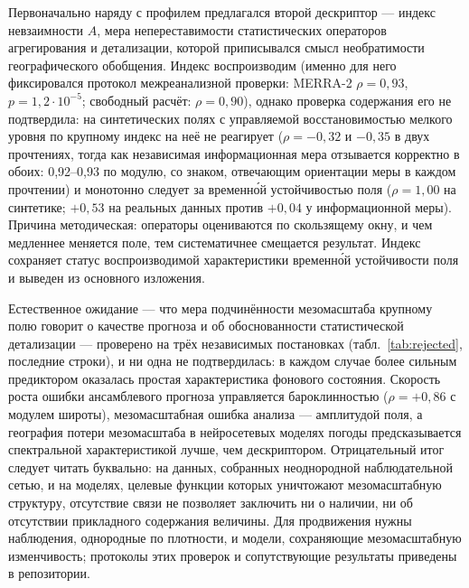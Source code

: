 \documentclass[11pt,a4paper]{article}
\begin{document}
Первоначально наряду с профилем предлагался второй дескриптор --- индекс невзаимности $A$, мера непереставимости статистических операторов агрегирования и детализации, которой приписывался смысл необратимости географического обобщения. Индекс воспроизводим (именно для него фиксировался протокол межреанализной проверки: MERRA-2 $\rho=0{,}93$, $p=1{,}2\cdot10^{-5}$; свободный расчёт: $\rho=0{,}90$), однако проверка содержания его не подтвердила: на синтетических полях с управляемой восстановимостью мелкого уровня по крупному индекс на неё не реагирует ($\rho=-0{,}32$ и $-0{,}35$ в двух прочтениях, тогда как независимая информационная мера отзывается корректно в обоих: 0,92--0,93 по модулю, со знаком, отвечающим ориентации меры в каждом прочтении) и монотонно следует за временн\'{о}й устойчивостью поля ($\rho=1{,}00$ на синтетике; $+0{,}53$ на реальных данных против $+0{,}04$ у информационной меры). Причина методическая: операторы оцениваются по скользящему окну, и чем медленнее меняется поле, тем систематичнее смещается результат. Индекс сохраняет статус воспроизводимой характеристики временн\'{о}й устойчивости поля и выведен из основного изложения.

Естественное ожидание --- что мера подчинённости мезомасштаба крупному полю говорит о качестве прогноза и об обоснованности статистической детализации --- проверено на трёх независимых постановках (табл.~\ref{tab:rejected}, последние строки), и ни одна не подтвердилась: в каждом случае более сильным предиктором оказалась простая характеристика фонового состояния. Скорость роста ошибки ансамблевого прогноза управляется бароклинностью ($\rho=+0{,}86$ с модулем широты), мезомасштабная ошибка анализа --- амплитудой поля, а география потери мезомасштаба в нейросетевых моделях погоды \cite{Lam2023,Bi2023,Price2025,Rasp2024} предсказывается спектральной характеристикой лучше, чем дескриптором. Отрицательный итог следует читать буквально: на данных, собранных неоднородной наблюдательной сетью, и на моделях, целевые функции которых уничтожают мезомасштабную структуру, отсутствие связи не позволяет заключить ни о наличии, ни об отсутствии прикладного содержания величины. Для продвижения нужны наблюдения, однородные по плотности, и модели, сохраняющие мезомасштабную изменчивость; протоколы этих проверок и сопутствующие результаты приведены в репозитории.
\end{document}
